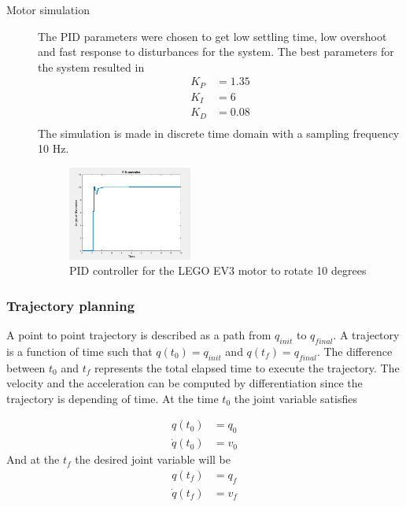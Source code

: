 \begin{description}
\item[Motor simulation]
The PID parameters were chosen to get low settling time, low overshoot and fast response to disturbances for the system. The best parameters for the system resulted in
\begin{equation}
    \begin{split}
        K_P & = 1.35 \\
        K_I & = 6 \\
        K_D & = 0.08 \\
    \end{split}
\end{equation}
The simulation is made in discrete time domain with a sampling frequency 10 Hz.
\begin{figure}[ht]
    \centering
    \includegraphics[width=0.4\textwidth]{sections/assets/pid_motor.png}
    \caption{PID controller for the LEGO EV3 motor to rotate 10 degrees}
    \label{fig1}
\end{figure}
\end{description}
\subsubsection{Trajectory planning}
A point to point trajectory is described as a path from $q_{init}$ to $q_{final}$. A trajectory is a function of time such that $q(t_0) = q_{init}$ and $q(t_f) = q_{final}$. The difference between $t_0$ and $t_f$ represents the total elapsed time to execute the trajectory. The velocity and the acceleration can be computed by differentiation since the trajectory is depending of time.
At the time $t_0$ the joint variable satisfies

\begin{equation} \label{eq10}
\begin{split}
     q(t_0) & = q_0 \\
    \dot{q}(t_0) & = v_0
\end{split}
\end{equation}
And at the $t_f$ the desired joint variable will be
\begin{equation} \label{eq11}
\begin{split}
     q(t_f) & = q_f \\
    \dot{q}(t_f) & = v_f
\end{split}
\end{equation}

